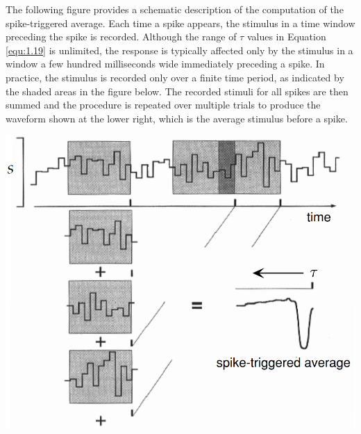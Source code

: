 \begin{exm}
  \label{exm:compute-SpiTriAve}
  The following figure provides a schematic description of the computation of the spike-triggered average. Each time a 
  spike appears, the stimulus in a time window preceding the spike is recorded. Although the range of $\tau$ 
  values in Equation \ref{equ:1.19} is unlimited, the response is typically affected only by the stimulus in a window 
  a few hundred milliseconds wide immediately preceding a spike. In practice, the stimulus is recorded only over a 
  finite time period, as indicated by the shaded areas in the figure below.
  The recorded stimuli for all 
  spikes are then summed and the procedure is repeated over multiple trials to produce the waveform shown at the lower right, which is the average stimulus before a spike.
  \begin{center}
    \includegraphics[scale=0.2]{./png/computation-spiTriAvST.png}
    \label{fig:1.8}  
  \end{center}
\end{exm}


